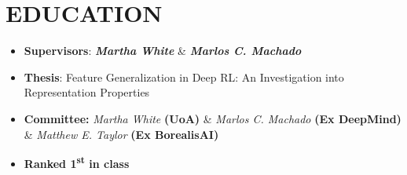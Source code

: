 \section{EDUCATION}

{}

\begin{itemize}
    \item \textbf{Supervisors}: \textbf{\textit{Martha White}} \& \textbf{\textit{Marlos C. Machado}}
    \item \textbf{Thesis}: Feature Generalization in Deep RL: An Investigation into Representation Properties
    \item \textbf{Committee:} {\textit{Martha White}} \textbf{(UoA)} \& {\textit{Marlos C. Machado}} \textbf{(Ex DeepMind)} \& {\textit{Matthew E. Taylor} \textbf{(Ex BorealisAI)}}
\end{itemize}



{}
\begin{itemize}
    \item \textbf{Ranked 1\textsuperscript{st} in class}
\end{itemize}